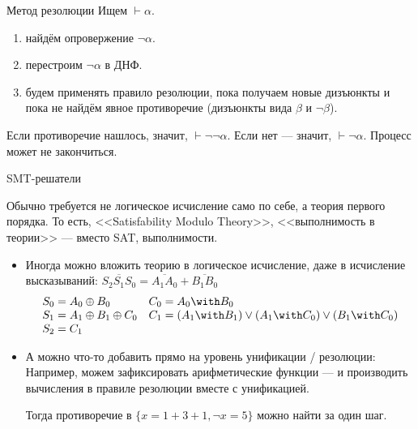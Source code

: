 \documentclass[aspectratio=169]{beamer}
\begin{document}
\begin{frame}{Метод резолюции}
Ищем $\vdash\alpha$.

\begin{enumerate}
\item найдём опровержение $\neg\alpha$.
\item перестроим $\neg\alpha$ в ДНФ.
\item будем применять правило резолюции, пока получаем новые дизъюнкты и пока 
не найдём явное противоречие (дизъюнкты вида $\beta$ и $\neg\beta$).
\end{enumerate}

Если противоречие нашлось, значит, $\vdash\neg\neg\alpha$. Если нет --- значит, $\vdash\neg\alpha$.
Процесс может не закончиться.
\end{frame}

\begin{frame}{SMT-решатели}

Обычно требуется не логическое исчисление само по себе, а теория первого порядка.
То есть, <<Satisfability Modulo Theory>>, <<выполнимость в теории>> --- вместо SAT, выполнимости.
\begin{itemize}
\item Иногда можно вложить теорию в логическое исчисление, 
даже в исчисление высказываний: $\overline{S_2S_1S_0} = \overline{A_1A_0}+\overline{B_1B_0}$
$$\begin{array}{ll}
S_0 = A_0 \oplus B_0 & C_0 = A_0 \with B_0\\
S_1 = A_1 \oplus B_1 \oplus C_0 & C_1 = (A_1 \with B_1) \vee (A_1 \with C_0) \vee (B_1 \with C_0) \\
S_2 = C_1\end{array}$$

\item А можно что-то добавить прямо на уровень унификации / резолюции:
Например, можем зафиксировать арифметические функции --- и производить вычисления
в правиле резолюции вместе с унификацией.

Тогда противоречие в $\{x = 1+3+1,\neg x = 5\}$ можно найти за один шаг.
\end{itemize}
\end{frame}
\end{document}
